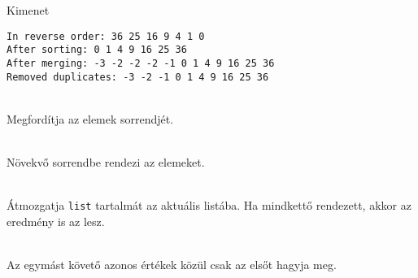 \begin{frame}[fragile]
    \begin{block}{Kimenet}
        \small
        \vspace{-.4cm}
        \begin{verbatim}
In reverse order: 36 25 16 9 4 1 0 
After sorting: 0 1 4 9 16 25 36 
After merging: -3 -2 -2 -2 -1 0 1 4 9 16 25 36 
Removed duplicates: -3 -2 -1 0 1 4 9 16 25 36
\end{verbatim}
        \vspace{-.3cm}
    \end{block}
    \vfill
    \begin{description}[m]
        \small
        \item[\hiv{\href{https://en.cppreference.com/w/cpp/container/list/reverse}{\texttt{reverse()}}}] \hfill \\ Megfordítja az elemek sorrendjét.
        \item[\hiv{\href{https://en.cppreference.com/w/cpp/container/list/sort}{\texttt{sort()}}}] \hfill \\ Növekvő sorrendbe rendezi az elemeket.
        \item[\hiv{\href{https://en.cppreference.com/w/cpp/container/list/merge}{\texttt{merge(list)}}}] \hfill \\ Átmozgatja \texttt{list} tartalmát az aktuális listába. Ha mindkettő rendezett, akkor az eredmény is az lesz.
        \item[\hiv{\href{https://en.cppreference.com/w/cpp/container/list/unique}{\texttt{unique()}}}] \hfill \\ Az egymást követő azonos értékek közül csak az elsőt hagyja meg.
    \end{description}
\end{frame}